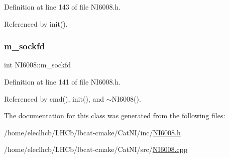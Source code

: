 Definition at line 143 of file N\+I6008.\+h.



Referenced by init().

\mbox{\label{classNI6008_aa1ca2ab973aaceac58d9d17e482682b5}} 
\subsubsection{\texorpdfstring{m\+\_\+sockfd}{m\_sockfd}}
{\footnotesize\ttfamily int N\+I6008\+::m\+\_\+sockfd\hspace{0.3cm}{\ttfamily [protected]}}



Definition at line 141 of file N\+I6008.\+h.



Referenced by cmd(), init(), and $\sim$\+N\+I6008().



The documentation for this class was generated from the following files\+:\begin{DoxyCompactItemize}
\item 
/home/eleclhcb/\+L\+H\+Cb/lbcat-\/cmake/\+Cat\+N\+I/inc/\hyperlink{NI6008_8h}{N\+I6008.\+h}\item 
/home/eleclhcb/\+L\+H\+Cb/lbcat-\/cmake/\+Cat\+N\+I/src/\hyperlink{NI6008_8cpp}{N\+I6008.\+cpp}\end{DoxyCompactItemize}
